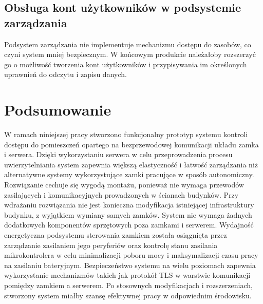         \subsection{Obsługa kont użytkowników w podsystemie zarządzania}

            Podsystem zarządzania nie implementuje mechanizmu dostępu do zasobów, co czyni system mniej bezpiecznym. W końcowym produkcie należałoby rozszerzyć go o możliwość tworzenia kont użytkowników i przypisywania im określonych uprawnień do odczytu i zapisu danych.

    \section{Podsumowanie}

        W ramach niniejszej pracy stworzono funkcjonalny prototyp systemu kontroli dostępu do pomieszczeń opartego na bezprzewodowej komunikacji układu zamka i serwera. Dzięki wykorzystaniu serwera w celu przeprowadzenia procesu uwierzytelniania system zapewnia większą elastyczność i łatwość zarządzania niż alternatywne systemy wykorzystujące zamki pracujące w sposób autonomiczny. Rozwiązanie cechuje się wygodą montażu, ponieważ nie wymaga przewodów zasilających i komunikacyjnych prowadzonych w ścianach budynków. Przy wdrażaniu rozwiązania nie jest konieczna modyfikacja istniejącej infrastruktury budynku, z wyjątkiem wymiany samych zamków. System nie wymaga żadnych dodatkowych komponentów sprzętowych poza zamkami i serwerem. Wydajność energetyczna podsystemu sterowania zamkiem została osiągnięta przez zarządzanie zasilaniem jego peryferiów oraz kontrolę stanu zasilania mikrokontrolera w celu minimalizacji poboru mocy i maksymalizacji czasu pracy na zasilaniu bateryjnym. Bezpieczeństwo systemu na wielu poziomach zapewnia wykorzystanie mechanizmów takich jak protokół TLS w warstwie komunikacji pomiędzy zamkiem a serwerem. Po stosownych modyfikacjach i rozszerzeniach, stworzony system miałby szansę efektywnej pracy w odpowiednim środowisku.